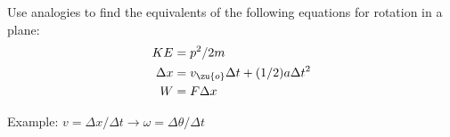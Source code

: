Use analogies to find the equivalents of the following
equations for rotation in a plane:
\begin{align*}
        KE  &=  p^2/2m \\
        \Delta x  &=  v_\zu{o}\Delta t + (1/2)a\Delta t^2\\
        W  &=   F \Delta x
\end{align*}

Example:
$v = \Delta x/\Delta t        \rightarrow        \omega = \Delta\theta/\Delta t$
